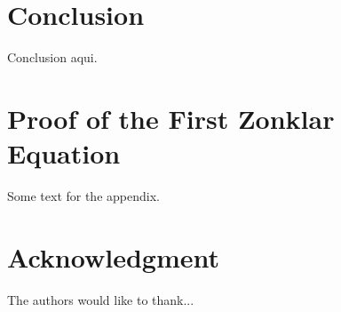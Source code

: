 \documentclass[journal]{IEEEtran}
\begin{document}
\section{Conclusion}
Conclusion aqui.






%


\appendices
\section{Proof of the First Zonklar Equation}
Some text for the appendix.

\section*{Acknowledgment}


The authors would like to thank...


\ifCLASSOPTIONcaptionsoff
  \newpage
\fi



\end{document}
